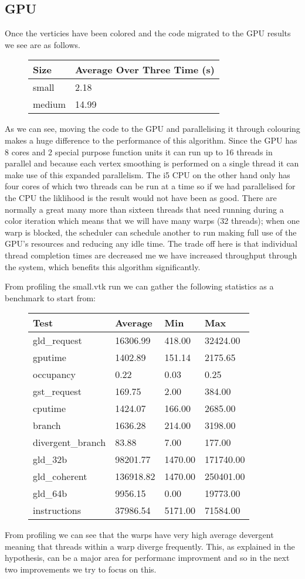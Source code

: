 \subsection*{GPU}
Once the verticies have been colored and the code migrated to the GPU results we see are as follows.\\
\begin{figure}[H]\centering \begin{tabular}{ l | l }
  \hline
  Size & Average Over Three Time (s) \\
  \hline
  \hline
  small & 2.18 \\
  medium & 14.99 \\
  \hline
\end{tabular} \end{figure}

As we can see, moving the code to the GPU and parallelising it through colouring makes a huge difference to the performance of this algorithm. Since the GPU has 8 cores and 2 special purpose function units it can run up to 16 threads in parallel and because each vertex smoothing is performed on a single thread it can make use of this expanded parallelism. The i5 CPU on the other hand only has four cores of which two threads can be run at a time so if we had parallelised for the CPU the liklihood is the result would not have been as good. There are normally a great many more than sixteen threads that need running during a color iteration which means that we will have many warps (32 threads); when one warp is blocked, the scheduler can schedule another to run making full use of the GPU's resources and reducing any idle time.
The trade off here is that individual thread completion times are decreased me we have increased throughput through the system, which benefits this algorithm significantly.

From profiling the small.vtk run we can gather the following statistics as a benchmark to start from:\\
\begin{figure}[H]\centering \begin{tabular}{ l | l | l | l}
\hline
Test & Average & Min & Max \\
\hline
\hline
gld\_request & 16306.99 & 418.00 & 32424.00 \\
gputime & 1402.89 & 151.14 & 2175.65 \\
occupancy & 0.22 & 0.03 & 0.25 \\
gst\_request & 169.75 & 2.00 & 384.00 \\
cputime & 1424.07 & 166.00 & 2685.00 \\
branch & 1636.28 & 214.00 & 3198.00 \\
divergent\_branch & 83.88 & 7.00 & 177.00 \\
gld\_32b & 98201.77 & 1470.00 & 171740.00 \\
gld\_coherent & 136918.82 & 1470.00 & 250401.00 \\
gld\_64b & 9956.15 & 0.00 & 19773.00 \\
instructions & 37986.54 & 5171.00 & 71584.00 \\
\hline
\end{tabular} \end{figure}

From profiling we can see that the warps have very high average devergent meaning that threads within a warp diverge frequently. This, as explained in the hypothesis, can be a major area for performanc improvment and so in the next two improvements we try to focus on this.
